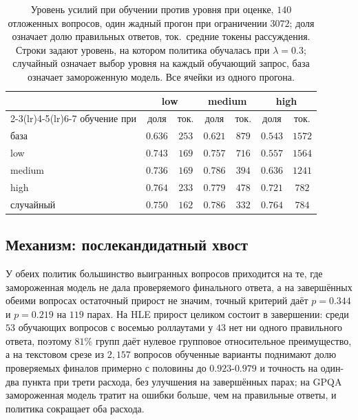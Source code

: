 \documentclass[11pt]{article}
\begin{document}
\begin{table}[t]
\centering
\small
\begin{tabular}{lcccccc}
\toprule
 & \multicolumn{2}{c}{low} & \multicolumn{2}{c}{medium} & \multicolumn{2}{c}{high} \\
\cmidrule(lr){2-3}\cmidrule(lr){4-5}\cmidrule(lr){6-7}
обучение при & доля & ток. & доля & ток. & доля & ток. \\
\midrule
база & $0.636$ & $253$ & $0.621$ & $879$ & $0.543$ & $1572$ \\
low & $0.743$ & $169$ & $0.757$ & $716$ & $0.557$ & $1564$ \\
medium & $0.736$ & $169$ & $0.786$ & $394$ & $0.636$ & $1241$ \\
high & $0.764$ & $233$ & $0.779$ & $478$ & $0.721$ & $782$ \\
случайный & $0.750$ & $162$ & $0.786$ & $332$ & $0.764$ & $784$ \\
\bottomrule
\end{tabular}
\caption{Уровень усилий при обучении против уровня при оценке, $140$ отложенных вопросов, один жадный прогон при ограничении $3072$; доля означает долю правильных ответов, ток.\ средние токены рассуждения. Строки задают уровень, на котором политика обучалась при $\lambda=0.3$; случайный означает выбор уровня на каждый обучающий запрос, база означает замороженную модель. Все ячейки из одного прогона.}
\label{tab:effort}
\end{table}

\subsection{Механизм: послекандидатный хвост}
\label{sec:limits-scope}

У обеих политик большинство выигранных вопросов приходится на те, где замороженная модель не дала проверяемого финального ответа, а на завершённых обеими вопросах остаточный прирост не значим, точный критерий даёт $p=0.344$ и $p=0.219$ на $119$ парах. На HLE прирост целиком состоит в завершении: среди $53$ обучающих вопросов с восемью роллаутами у $43$ нет ни одного правильного ответа, поэтому $81\%$ групп даёт нулевое групповое относительное преимущество, а на текстовом срезе из $2{,}157$ вопросов обученные варианты поднимают долю проверяемых финалов примерно с половины до $0.923$-$0.979$ и точность на один-два пункта при трети расхода, без улучшения на завершённых парах; на GPQA замороженная модель тратит на ошибки больше, чем на правильные ответы, и политика сокращает оба расхода.
\end{document}
